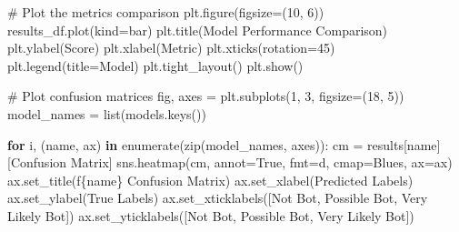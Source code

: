 \documentclass[
  12pt,
  letterpaper,
  DIV=11,
  numbers=noendperiod]{scrartcl}
\newenvironment{Shaded}{\begin{snugshade}}{\end{snugshade}}
\newcommand{\BuiltInTok}[1]{\textcolor[rgb]{0.00,0.23,0.31}{#1}}
\newcommand{\CommentTok}[1]{\textcolor[rgb]{0.37,0.37,0.37}{#1}}
\newcommand{\ControlFlowTok}[1]{\textcolor[rgb]{0.00,0.23,0.31}{\textbf{#1}}}
\newcommand{\DecValTok}[1]{\textcolor[rgb]{0.68,0.00,0.00}{#1}}
\newcommand{\KeywordTok}[1]{\textcolor[rgb]{0.00,0.23,0.31}{\textbf{#1}}}
\newcommand{\NormalTok}[1]{\textcolor[rgb]{0.00,0.23,0.31}{#1}}
\newcommand{\OperatorTok}[1]{\textcolor[rgb]{0.37,0.37,0.37}{#1}}
\newcommand{\SpecialCharTok}[1]{\textcolor[rgb]{0.37,0.37,0.37}{#1}}
\newcommand{\SpecialStringTok}[1]{\textcolor[rgb]{0.13,0.47,0.30}{#1}}
\newcommand{\StringTok}[1]{\textcolor[rgb]{0.13,0.47,0.30}{#1}}
\newcommand{\VariableTok}[1]{\textcolor[rgb]{0.07,0.07,0.07}{#1}}
\begin{document}
\begin{Shaded}
\begin{Highlighting}[]
\CommentTok{\# Plot the metrics comparison}
\NormalTok{plt.figure(figsize}\OperatorTok{=}\NormalTok{(}\DecValTok{10}\NormalTok{, }\DecValTok{6}\NormalTok{))}
\NormalTok{results\_df.plot(kind}\OperatorTok{=}\StringTok{\textquotesingle{}bar\textquotesingle{}}\NormalTok{)}
\NormalTok{plt.title(}\StringTok{\textquotesingle{}Model Performance Comparison\textquotesingle{}}\NormalTok{)}
\NormalTok{plt.ylabel(}\StringTok{\textquotesingle{}Score\textquotesingle{}}\NormalTok{)}
\NormalTok{plt.xlabel(}\StringTok{\textquotesingle{}Metric\textquotesingle{}}\NormalTok{)}
\NormalTok{plt.xticks(rotation}\OperatorTok{=}\DecValTok{45}\NormalTok{)}
\NormalTok{plt.legend(title}\OperatorTok{=}\StringTok{\textquotesingle{}Model\textquotesingle{}}\NormalTok{)}
\NormalTok{plt.tight\_layout()}
\NormalTok{plt.show()}

\CommentTok{\# Plot confusion matrices}
\NormalTok{fig, axes }\OperatorTok{=}\NormalTok{ plt.subplots(}\DecValTok{1}\NormalTok{, }\DecValTok{3}\NormalTok{, figsize}\OperatorTok{=}\NormalTok{(}\DecValTok{18}\NormalTok{, }\DecValTok{5}\NormalTok{))}
\NormalTok{model\_names }\OperatorTok{=} \BuiltInTok{list}\NormalTok{(models.keys())}

\ControlFlowTok{for}\NormalTok{ i, (name, ax) }\KeywordTok{in} \BuiltInTok{enumerate}\NormalTok{(}\BuiltInTok{zip}\NormalTok{(model\_names, axes)):}
\NormalTok{    cm }\OperatorTok{=}\NormalTok{ results[name][}\StringTok{\textquotesingle{}Confusion Matrix\textquotesingle{}}\NormalTok{]}
\NormalTok{    sns.heatmap(cm, annot}\OperatorTok{=}\VariableTok{True}\NormalTok{, fmt}\OperatorTok{=}\StringTok{\textquotesingle{}d\textquotesingle{}}\NormalTok{, cmap}\OperatorTok{=}\StringTok{\textquotesingle{}Blues\textquotesingle{}}\NormalTok{, ax}\OperatorTok{=}\NormalTok{ax)}
\NormalTok{    ax.set\_title(}\SpecialStringTok{f\textquotesingle{}}\SpecialCharTok{\{}\NormalTok{name}\SpecialCharTok{\}}\SpecialStringTok{ Confusion Matrix\textquotesingle{}}\NormalTok{)}
\NormalTok{    ax.set\_xlabel(}\StringTok{\textquotesingle{}Predicted Labels\textquotesingle{}}\NormalTok{)}
\NormalTok{    ax.set\_ylabel(}\StringTok{\textquotesingle{}True Labels\textquotesingle{}}\NormalTok{)}
\NormalTok{    ax.set\_xticklabels([}\StringTok{\textquotesingle{}Not Bot\textquotesingle{}}\NormalTok{, }\StringTok{\textquotesingle{}Possible Bot\textquotesingle{}}\NormalTok{, }\StringTok{\textquotesingle{}Very Likely Bot\textquotesingle{}}\NormalTok{])}
\NormalTok{    ax.set\_yticklabels([}\StringTok{\textquotesingle{}Not Bot\textquotesingle{}}\NormalTok{, }\StringTok{\textquotesingle{}Possible Bot\textquotesingle{}}\NormalTok{, }\StringTok{\textquotesingle{}Very Likely Bot\textquotesingle{}}\NormalTok{])}


\end{Highlighting}
\end{Shaded}
\end{document}
